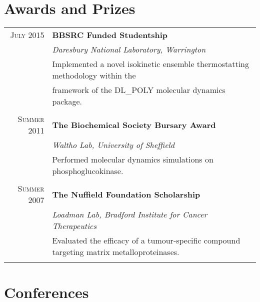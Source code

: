 \documentclass[11pt]{article} %
\begin{document}
\section{Awards and Prizes} 
\begin{tabular}{rl}

\textsc{July 2015} & \large{\textbf{BBSRC Funded Studentship}}\\
& \textit{Daresbury National Laboratory, Warrington}\\
& Implemented a novel isokinetic ensemble thermostatting methodology within the\\ &framework of the DL\_POLY molecular dynamics package.\\
\\

\textsc{Summer 2011} & \large{\textbf{The Biochemical Society Bursary Award}}\\
& \textit{Waltho Lab, University of Sheffield}\\
& Performed molecular dynamics simulations on phosphoglucokinase.\\
\\

\textsc{Summer 2007} & \large{\textbf{The Nuffield Foundation Scholarship}}\\
& \textit{Loadman Lab, Bradford Institute for Cancer Therapeutics}\\
& Evaluated the efficacy of a tumour-specific compound targeting matrix metalloproteinases.\\
\\

\end{tabular}

\section{Conferences}
\end{document}
